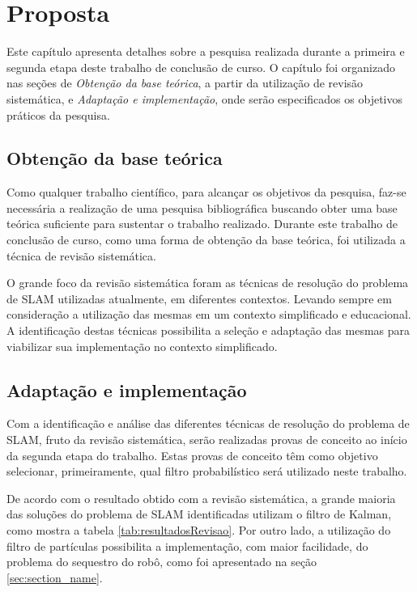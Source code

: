 \chapter[Proposta]{Proposta}

Este capítulo apresenta detalhes sobre a pesquisa realizada durante a primeira e segunda etapa deste trabalho de conclusão de curso. O capítulo foi organizado nas seções de \textit{Obtenção da base teórica}, a partir da utilização de revisão sistemática, e \textit{Adaptação e implementação}, onde serão especificados os objetivos práticos da pesquisa.

\section{Obtenção da base teórica} %
\label{sec:obtenção_da_base_teórica}
	
	Como qualquer trabalho científico, para alcançar os objetivos da pesquisa, faz-se necessária a realização de uma pesquisa bibliográfica buscando obter uma base teórica suficiente para sustentar o trabalho realizado. Durante este trabalho de conclusão de curso, como uma forma de obtenção da base teórica, foi utilizada a técnica de revisão sistemática.

	O grande foco da revisão sistemática foram as técnicas de resolução do problema de SLAM utilizadas atualmente, em diferentes contextos. Levando sempre em consideração a utilização das mesmas em um contexto simplificado e educacional. A identificação destas técnicas possibilita a seleção e adaptação das mesmas para viabilizar sua implementação no contexto simplificado.

\section{Adaptação e implementação} %
\label{sec:adaptação_e_implementação}

	Com a identificação e análise das diferentes técnicas de resolução do problema de SLAM, fruto da revisão sistemática, serão realizadas provas de conceito ao início da segunda etapa do trabalho. Estas provas de conceito têm como objetivo selecionar, primeiramente, qual filtro probabilístico será utilizado neste trabalho.

	De acordo com o resultado obtido com a revisão sistemática, a grande maioria das soluções do problema de SLAM identificadas utilizam o filtro de Kalman, como mostra a tabela \ref{tab:resultadosRevisao}. Por outro lado, a utilização do filtro de partículas possibilita a implementação, com maior facilidade, do problema do sequestro do robô, como foi apresentado na seção \ref{sec:section_name}.


